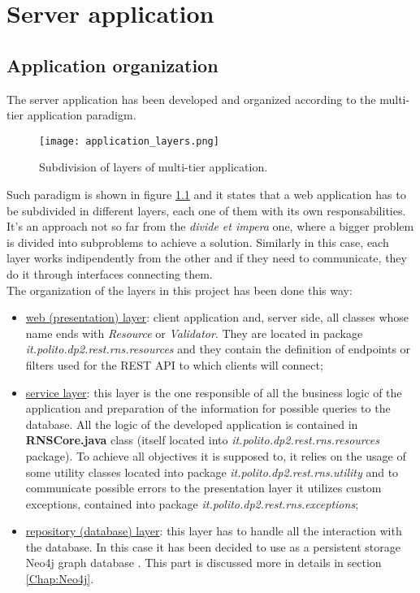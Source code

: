 \chapter{Server application}
\section{Application organization}
The server application has been developed and organized according to the multi-tier application paradigm.
\begin{figure}[!htb]
   \centering
   \texttt{[image: application\_layers.png]}
   \caption{Subdivision of layers of multi-tier application.}\label{Fig:AppMultiTier}
\end{figure}
Such paradigm is shown in figure \ref{Fig:AppMultiTier} and it states that a web application has to be subdivided in different layers, each one of them with its own responsabilities. It's an approach not so far from the \textit{divide et impera} one, where a bigger problem is divided into subproblems to achieve a solution. Similarly in this case, each layer works indipendently from the other and if they need to communicate, they do it through interfaces connecting them.\\
The organization of the layers in this project has been done this way:
\begin{itemize}
  \item \underline{web (presentation) layer}: client application and, server side, all classes whose name ends with \textit{Resource} or \textit{Validator}. They are located in package \textit{it.polito.dp2.rest.rns.resources} and they contain the definition of endpoints or filters used for the REST API to which clients will connect;
  \item \underline{service layer}: this layer is the one responsible of all the business logic of the application and preparation of the information for possible queries to the database. All the logic of the developed application is contained in \textbf{RNSCore.java} class (itself located into \textit{it.polito.dp2.rest.rns.resources} package). To achieve all objectives it is supposed to, it relies on the usage of some utility classes located into package \textit{it.polito.dp2.rest.rns.utility} and to communicate possible errors to the presentation layer it utilizes custom exceptions, contained into package \textit{it.polito.dp2.rest.rns.exceptions};
  \item \underline{repository (database) layer}: this layer has to handle all the interaction with the database. In this case it has been decided to use as a persistent storage Neo4j graph database \cite{neo4j}. This part is discussed more in details in section \ref{Chap:Neo4j}.
\end{itemize}
